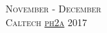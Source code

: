 \documentclass[landscape,a4paper]{article}
\begin{document}
\pagestyle{empty} %

\noindent



\begin{center}
\textsc{\LARGE November - December}\\ %
\textsc{\large Caltech \href{https://piazza.com/caltech/fall2017/ph2a/home}{ph2a} 2017} %
\end{center}

\end{document}
